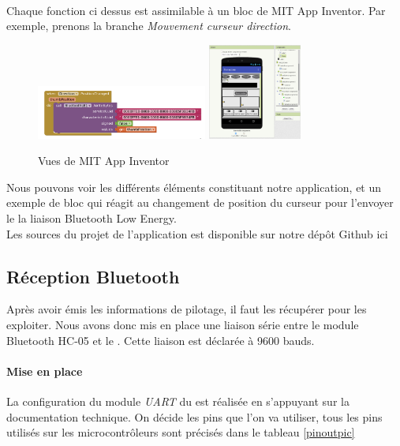 		\\Chaque fonction ci dessus est assimilable à un bloc de MIT App Inventor. Par exemple, prenons la branche \textit{Mouvement curseur direction}.
		\begin{figure}
			\begin{center}		
				\includegraphics[width=0.5\textwidth]{../Illus/MITBlock.png}
				\includegraphics[width=0.275\textwidth]{../Illus/MITScreen.png}
			\end{center}
			\caption{Vues de MIT App Inventor}
		\end{figure}
		Nous pouvons voir les différents éléments constituant notre application, et un exemple de bloc qui réagit au changement de position du curseur pour l'envoyer le la liaison Bluetooth Low Energy.
		\\Les sources du projet de l'application est disponible sur notre dépôt Github ici\cite{git}
			\subsection{Réception Bluetooth}
			Après avoir émis les informations de pilotage, il faut les récupérer pour les exploiter. Nous avons donc mis en place une liaison série entre le module Bluetooth HC-05 et le \pic. Cette liaison est déclarée à 9600 bauds.
			\paragraph{Mise en place}La configuration du module \textit{UART} du \pic est réalisée en s'appuyant sur la documentation technique\cite[p.~315]{DatasheetPIC}. On décide les pins que l'on va utiliser, tous les pins utilisés sur les microcontrôleurs sont précisés dans le tableau \ref{pinoutpic}
			
			
